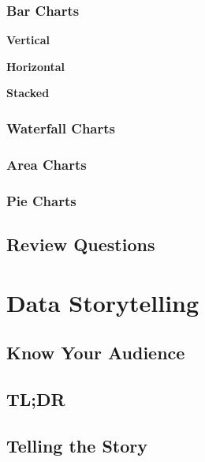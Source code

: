 \documentclass[]{book}
\begin{document}
\hypertarget{bar-charts}{%
\subsection{Bar Charts}\label{bar-charts}}

\textbf{Vertical}

\textbf{Horizontal}

\textbf{Stacked}

\hypertarget{waterfall-charts}{%
\subsection{Waterfall Charts}\label{waterfall-charts}}

\hypertarget{area-charts}{%
\subsection{Area Charts}\label{area-charts}}

\hypertarget{pie-charts}{%
\subsection{Pie Charts}\label{pie-charts}}

\hypertarget{review-questions-13}{%
\section{Review Questions}\label{review-questions-13}}

\hypertarget{storytelling}{%
\chapter{Data Storytelling}\label{storytelling}}

\hypertarget{know-your-audience}{%
\section{Know Your Audience}\label{know-your-audience}}

\hypertarget{tldr}{%
\section{TL;DR}\label{tldr}}

\hypertarget{telling-the-story}{%
\section{Telling the Story}\label{telling-the-story}}
\end{document}
